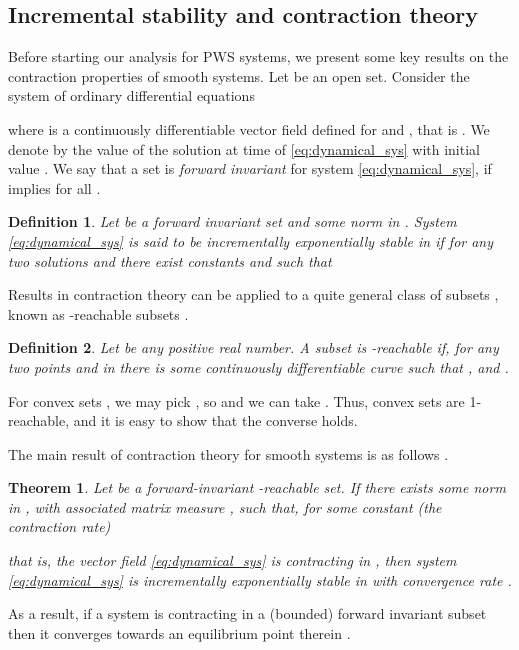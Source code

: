 \documentclass[twocolumn]{autart}
\newtheorem{theorem}{Theorem}
\newtheorem{definition}{Definition}
\begin{document}
\subsection{Incremental stability and contraction theory}
\label{sec:incr_stab}
Before starting our analysis for PWS systems, we present some key results on the contraction properties of smooth systems. Let  be an open set. Consider the system of ordinary differential equations

where  is a continuously differentiable vector field defined for  and , that is .
We denote by  the value of the solution  at time  of \eqref{eq:dynamical_sys} with initial value .
We say that a set  is \emph{forward invariant} for system \eqref{eq:dynamical_sys}, if  implies  for all .
\begin{definition}
\label{def:incr_stability}
Let  be a forward invariant set and  some norm in . System \eqref{eq:dynamical_sys} is said to be \emph{incrementally exponentially stable} in  if for any two solutions  and  there exist constants  and  such that 

\end{definition}
Results in contraction theory can be applied to a quite general class of subsets , known as -reachable subsets \citep{russo2010global}.
\begin{definition}
Let  be any positive real number. A subset  is \emph{-reachable} if, for any two points  and  in  there is some continuously differentiable curve  such that ,  and .
\end{definition}
For convex sets , we may pick , so  and we can take . Thus, convex sets are 1-reachable, and it is easy to show that the converse holds.

The main result of contraction theory for smooth systems is as follows \cite{lohmiller1998contraction,russo2010global}.
\begin{theorem}
\label{thm:contraction}
Let  be a forward-invariant -reachable set. If there exists some norm in , with associated matrix measure , such that, for some constant  (the \emph{contraction rate})

that is, the vector field \eqref{eq:dynamical_sys} is \emph{contracting} in , then system \eqref{eq:dynamical_sys} is incrementally exponentially stable in  with convergence rate .
\end{theorem}
As a result, if a system is contracting in a (bounded) forward invariant subset then it converges towards an equilibrium point therein \citep{russo2010global,lohmiller1998contraction}.
\end{document}
